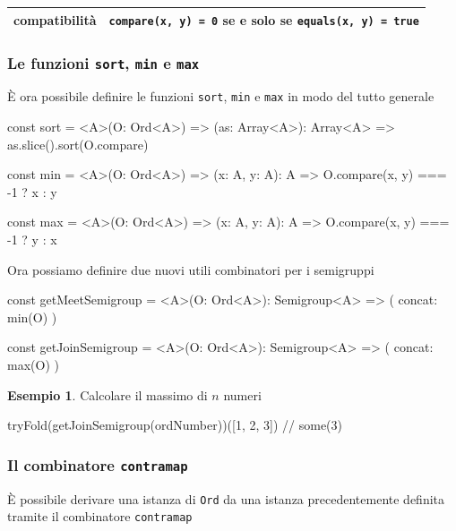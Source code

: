 \documentclass[12pt]{article}
\theoremstyle{definition}
\newtheorem{example}{Esempio}[section]
\newenvironment{code}
  {\vspace{0.5cm} \VerbatimEnvironment\begin{typescriptcode}}
  {\end{typescriptcode} \vspace{0.2cm}}
\begin{document}
\begin{center}
\bgroup
\def\arraystretch{1.5}
\begin{tabular}{ |c|p{10cm}| }
\hline
compatibilità & \texttt{compare(x, y) = 0} se e solo se \texttt{equals(x, y) = true} \\
\hline
\end{tabular}
\egroup
\end{center}

\subsubsection{Le funzioni \texttt{sort}, \texttt{min} e \texttt{max}}

È ora possibile definire le funzioni \texttt{sort}, \texttt{min} e \texttt{max} in modo del tutto generale

\begin{code}
const sort = <A>(O: Ord<A>) => (as: Array<A>): Array<A> =>
  as.slice().sort(O.compare)

const min = <A>(O: Ord<A>) => (x: A, y: A): A =>
  O.compare(x, y) === -1 ? x : y

const max = <A>(O: Ord<A>) => (x: A, y: A): A =>
  O.compare(x, y) === -1 ? y : x
\end{code}

Ora possiamo definire due nuovi utili combinatori per i semigruppi

\begin{code}
const getMeetSemigroup = <A>(O: Ord<A>): Semigroup<A> => ({
  concat: min(O)
})

const getJoinSemigroup = <A>(O: Ord<A>): Semigroup<A> => ({
  concat: max(O)
})
\end{code}

\begin{example}
Calcolare il massimo di $n$ numeri

\begin{code}
tryFold(getJoinSemigroup(ordNumber))([1, 2, 3]) // some(3)
\end{code}
\end{example}

\subsubsection{Il combinatore \texttt{contramap}}

È possibile derivare una istanza di \texttt{Ord} da una istanza precedentemente definita tramite il combinatore \texttt{contramap}
\end{document}
